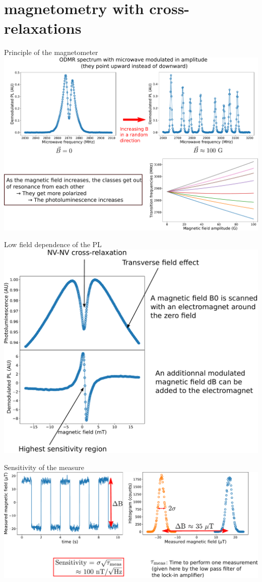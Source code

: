 \documentclass{beamer}
\begin{document}
\section{magnetometry with cross-relaxations}
\begin{frame}
\tableofcontents[currentsection]
\end{frame}
\begin{frame}{Principle of the magnetometer}
\centering
\includegraphics[scale=.22]{Slide_principe_magnetoNVNV}
\end{frame}
\begin{frame}{Low field dependence of the PL}
\centering
\includegraphics[scale=.23]{slide_magneto_scan}
\end{frame}
\begin{frame}{Sensitivity of the measure}
\centering
\includegraphics[scale=.26]{slide_sensi_measure}
\end{frame}
\end{document}
